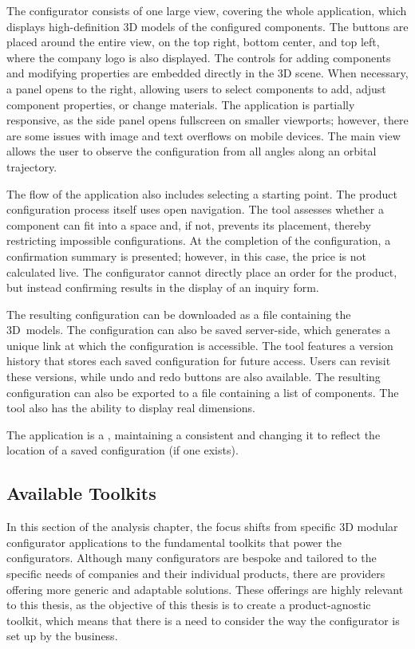 The configurator consists of one large view, covering the whole application, which displays high-definition 3D models of the configured components. The buttons are placed around the entire view, on the top right, bottom center, and top left, where the company logo is also displayed.  The controls for adding components and modifying properties are embedded directly in the 3D scene. When necessary, a panel opens to the right, allowing users to select components to add, adjust component properties, or change materials. The application is partially responsive, as the side panel opens fullscreen on smaller viewports; however, there are some issues with image and text overflows on mobile devices. The main view allows the user to observe the configuration from all angles along an orbital trajectory.

The flow of the application also includes selecting a starting point. The product configuration process itself uses open navigation. The tool assesses whether a component can fit into a space and, if not, prevents its placement, thereby restricting impossible configurations. At the completion of the configuration, a confirmation summary is presented; however, in this case, the price is not calculated live. The configurator cannot directly place an order for the product, but instead confirming results in the display of an inquiry form.

The resulting configuration can be downloaded as a file containing the 3D~models. The configuration can also be saved server-side, which generates a unique link at which the configuration is accessible. The tool features a version history that stores each saved configuration for future access. Users can revisit these versions, while undo and redo buttons are also available. The resulting configuration can also be exported to a  file containing a list of components. The tool also has the ability to display real dimensions.

The application is a , maintaining a consistent  and changing it to reflect the location of a saved configuration (if one exists).


\subsection{Available Toolkits}

In this section of the analysis chapter, the focus shifts from specific 3D modular configurator applications to the fundamental toolkits that power the configurators. Although many configurators are bespoke and tailored to the specific needs of companies and their individual products, there are providers offering more generic and adaptable solutions. These offerings are highly relevant to this thesis, as the objective of this thesis is to create a product-agnostic toolkit, which means that there is a need to consider the way the configurator is set up by the business.

